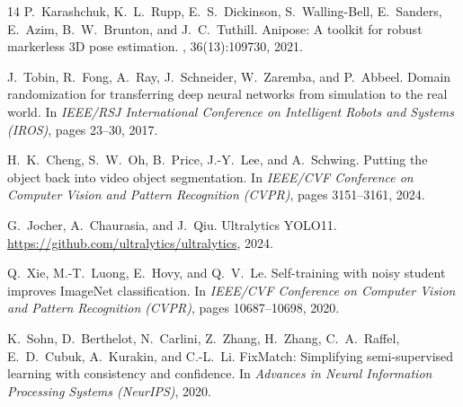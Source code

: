 \documentclass[10pt,twocolumn,letterpaper]{article}
\begin{document}
{\begin{thebibliography}{14}
P.~Karashchuk, K.~L.~Rupp, E.~S.~Dickinson, S.~Walling-Bell, E.~Sanders, E.~Azim, B.~W.~Brunton, and J.~C.~Tuthill.
\newblock Anipose: A toolkit for robust markerless 3D pose estimation.
, 36(13):109730, 2021.

J.~Tobin, R.~Fong, A.~Ray, J.~Schneider, W.~Zaremba, and P.~Abbeel.
\newblock Domain randomization for transferring deep neural networks from simulation to the real world.
\newblock In {\em IEEE/RSJ International Conference on Intelligent Robots and Systems (IROS)}, pages 23--30, 2017.

H.~K.~Cheng, S.~W.~Oh, B.~Price, J.-Y.~Lee, and A.~Schwing.
\newblock Putting the object back into video object segmentation.
\newblock In {\em IEEE/CVF Conference on Computer Vision and Pattern Recognition (CVPR)}, pages 3151--3161, 2024.

G.~Jocher, A.~Chaurasia, and J.~Qiu.
\newblock Ultralytics YOLO11.
\newblock \url{https://github.com/ultralytics/ultralytics}, 2024.

Q.~Xie, M.-T.~Luong, E.~Hovy, and Q.~V.~Le.
\newblock Self-training with noisy student improves ImageNet classification.
\newblock In {\em IEEE/CVF Conference on Computer Vision and Pattern Recognition (CVPR)}, pages 10687--10698, 2020.

K.~Sohn, D.~Berthelot, N.~Carlini, Z.~Zhang, H.~Zhang, C.~A.~Raffel, E.~D.~Cubuk, A.~Kurakin, and C.-L.~Li.
\newblock FixMatch: Simplifying semi-supervised learning with consistency and confidence.
\newblock In {\em Advances in Neural Information Processing Systems (NeurIPS)}, 2020.
\end{thebibliography}
}
\end{document}
